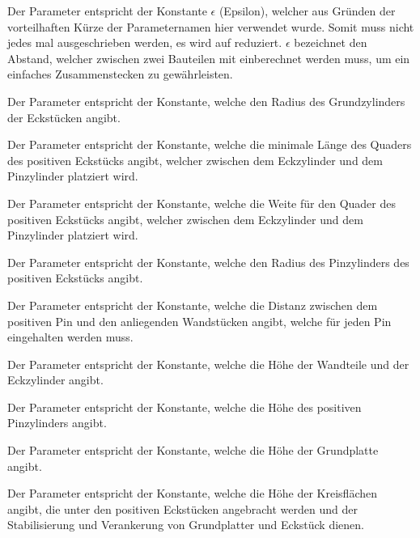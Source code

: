 \begin{description}[style=nextline]
	\item[E ($\epsilon$/Epsilon)] 
		Der Parameter  entspricht der Konstante $\epsilon$ (Epsilon), welcher aus Gründen der vorteilhaften Kürze der Parameternamen hier verwendet wurde.
		Somit muss nicht jedes mal  ausgeschrieben werden, es wird auf  reduziert.
		$\epsilon$ bezeichnet den Abstand, welcher zwischen zwei Bauteilen mit einberechnet werden muss, um ein einfaches Zusammenstecken zu gewährleisten.
	\item[CornerRadius]
		Der Parameter  entspricht der Konstante, welche den Radius des Grundzylinders der Eckstücken angibt.
	\item[PinMinLength] 
		Der Parameter  entspricht der Konstante, welche die minimale Länge des Quaders des positiven Eckstücks angibt, welcher zwischen dem Eckzylinder und dem Pinzylinder platziert wird.
	\item[PinPWidth] 
		Der Parameter  entspricht der Konstante, welche die Weite für den Quader des positiven Eckstücks angibt, welcher zwischen dem Eckzylinder und dem Pinzylinder platziert wird.
	\item[PinPRadius] 
		Der Parameter  entspricht der Konstante, welche den Radius des Pinzylinders des positiven Eckstücks angibt.
	\item[PinDistance]
		Der Parameter  entspricht der Konstante, welche die Distanz zwischen dem positiven Pin und den anliegenden Wandstücken angibt, welche für jeden Pin eingehalten werden muss.
	\item[Height]
		Der Parameter  entspricht der Konstante, welche die Höhe der Wandteile und der Eckzylinder angibt.
	\item[PinHeight]
		Der Parameter  entspricht der Konstante, welche die Höhe des positiven Pinzylinders angibt.
	\item[BasePlateHeight]
		Der Parameter  entspricht der Konstante, welche die Höhe der Grundplatte angibt.
	\item[BasePlatePinCircleHeight]
		Der Parameter  entspricht der Konstante, welche die Höhe der Kreisflächen angibt, die unter den positiven Eckstücken angebracht werden und der Stabilisierung und Verankerung von Grundplatter und Eckstück dienen.
\end{description}

